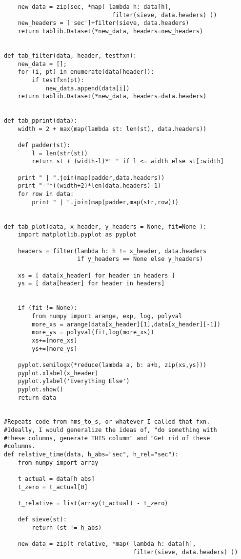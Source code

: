 \begin{verbatim}
    new_data = zip(sec, *map( lambda h: data[h],
                               filter(sieve, data.headers) ))
    new_headers = ['sec']+filter(sieve, data.headers)
    return tablib.Dataset(*new_data, headers=new_headers)


def tab_filter(data, header, testfxn):
    new_data = [];
    for (i, pt) in enumerate(data[header]):
        if testfxn(pt):
            new_data.append(data[i])
    return tablib.Dataset(*new_data, headers=data.headers)


def tab_pprint(data):
    width = 2 + max(map(lambda st: len(st), data.headers))

    def padder(st):
        l = len(str(st))
        return st + (width-l)*" " if l <= width else st[:width]

    print " | ".join(map(padder,data.headers))
    print "-"*((width+2)*len(data.headers)-1)
    for row in data:
        print " | ".join(map(padder,map(str,row)))


def tab_plot(data, x_header, y_headers = None, fit=None ):
    import matplotlib.pyplot as pyplot

    headers = filter(lambda h: h != x_header, data.headers 
                     if y_headers == None else y_headers)

    xs = [ data[x_header] for header in headers ]
    ys = [ data[header] for header in headers]


    if (fit != None):
        from numpy import arange, exp, log, polyval
        more_xs = arange(data[x_header][1],data[x_header][-1])
        more_ys = polyval(fit,log(more_xs))
        xs+=[more_xs]
        ys+=[more_ys]

    pyplot.semilogx(*reduce(lambda a, b: a+b, zip(xs,ys)))
    pyplot.xlabel(x_header)
    pyplot.ylabel('Everything Else')
    pyplot.show()
    return data


#Repeats code from hms_to_s, or whatever I called that fxn.
#Ideally, I would generalize the ideas of, "do something with
#these columns, generate THIS column" and "Get rid of these
#columns.
def relative_time(data, h_abs="sec", h_rel="sec"):
    from numpy import array

    t_actual = data[h_abs]
    t_zero = t_actual[0]

    t_relative = list(array(t_actual) - t_zero)

    def sieve(st):
        return (st != h_abs)

    new_data = zip(t_relative, *map( lambda h: data[h],
                                     filter(sieve, data.headers) ))


\end{verbatim}
